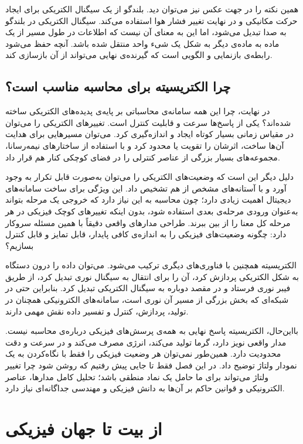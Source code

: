 همین نکته را در جهت عکس نیز می‌توان دید. بلندگو از یک سیگنال الکتریکی برای ایجاد حرکت مکانیکی و در نهایت تغییر فشار هوا استفاده می‌کند. سیگنال الکتریکی در بلندگو به صدا تبدیل می‌شود، اما این به معنای آن نیست که اطلاعات در طول مسیر از یک ماده به ماده‌ی دیگر به شکل یک شیء واحد منتقل شده باشد. آنچه حفظ می‌شود رابطه‌ی بازنمایی و الگویی است که گیرنده‌ی نهایی می‌تواند از آن بازسازی کند.

\subsection{چرا الکتریسیته برای محاسبه مناسب است؟}
\label{sub:why-electricity-for-computation}

در نهایت، چرا این همه سامانه‌ی محاسباتی بر پایه‌ی پدیده‌های الکتریکی ساخته شده‌اند؟ یکی از پاسخ‌ها سرعت و قابلیت کنترل است. تغییرهای الکتریکی را می‌توان در مقیاس زمانی بسیار کوتاه ایجاد و اندازه‌گیری کرد. می‌توان مسیرهایی برای هدایت آن‌ها ساخت، اثرشان را تقویت یا محدود کرد و با استفاده از ساختارهای نیمه‌رسانا، مجموعه‌های بسیار بزرگی از عناصر کنترلی را در فضای کوچکی کنار هم قرار داد.

دلیل دیگر این است که وضعیت‌های الکتریکی را می‌توان به‌صورت قابل تکرار به وجود آورد و با آستانه‌های مشخص از هم تشخیص داد. این ویژگی برای ساخت سامانه‌های دیجیتال اهمیت زیادی دارد؛ چون محاسبه به این نیاز دارد که خروجی یک مرحله بتواند به‌عنوان ورودی مرحله‌ی بعدی استفاده شود، بدون اینکه تغییرهای کوچک فیزیکی در هر مرحله کل معنا را از بین ببرند. طراحی مدارهای واقعی دقیقاً با همین مسئله سروکار دارد: چگونه وضعیت‌های فیزیکی را به اندازه‌ی کافی پایدار، قابل تمایز و قابل کنترل بسازیم؟

الکتریسیته همچنین با فناوری‌های دیگری ترکیب می‌شود. می‌توان داده را درون دستگاه به شکل الکتریکی پردازش کرد، آن را برای انتقال به سیگنال نوری تبدیل کرد، از طریق فیبر نوری فرستاد و در مقصد دوباره به سیگنال الکتریکی تبدیل کرد. بنابراین حتی در شبکه‌ای که بخش بزرگی از مسیر آن نوری است، سامانه‌های الکترونیکی همچنان در تولید، پردازش، کنترل و تفسیر داده نقش مهمی دارند.

بااین‌حال، الکتریسیته پاسخ نهایی به همه‌ی پرسش‌های فیزیکی درباره‌ی محاسبه نیست. مدار واقعی نویز دارد، گرما تولید می‌کند، انرژی مصرف می‌کند و در سرعت و دقت محدودیت دارد. همین‌طور نمی‌توان هر وضعیت فیزیکی را فقط با نگاه‌کردن به یک نمودار ولتاژ توضیح داد. در این فصل فقط تا جایی پیش رفتیم که روشن شود چرا تغییر ولتاژ می‌تواند برای ما حامل یک نماد منطقی باشد؛ تحلیل کامل مدارها، عناصر الکترونیکی و قوانین حاکم بر آن‌ها به دانش فیزیکی و مهندسی جداگانه‌ای نیاز دارد.

\section{از بیت تا جهان فیزیکی}
\label{sec:from-bit-to-physical-world}

